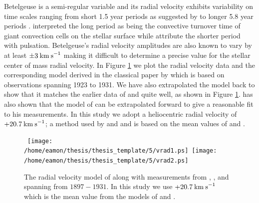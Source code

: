 Betelgeuse is a  semi-regular variable and its radial velocity exhibits variability on time scales ranging from short 1.5 year periods as suggested by \cite{stebbins_1931} to longer 5.8 year periods \citep{spencer_jones_1928,smith_1989}. 
\cite{stothers_1971} interpreted the long period as being the convective turnover time of giant convection cells on the stellar surface while \cite{dupree_1990} attribute the shorter period with pulsation. Betelgeuse's radial velocity amplitudes are also known to vary by at least $\pm 3\>{\rm km\>s}^{-1}$ \citep{smith_1989} making it difficult to determine a precise value for the stellar center of mass radial velocity. In Figure \ref{fig:5.3} we plot the radial velocity data and the corresponding model derived in the classical paper by \cite{sanford_1933} which is based on observations spanning 1923 to 1931. We have also extrapolated the model back to show that it matches the earlier data of \cite{bottlinger_1911} and \cite{spencer_jones_1928} quite well, as shown in Figure \ref{fig:5.3}. \cite{goldberg_1984} has also shown that the model of \cite{sanford_1933} can be extrapolated forward to give a reasonable fit to his measurements. In this study we adopt a heliocentric radial velocity of $+20.7\>{\rm km\>s}^{-1}$;  a method used by \cite{weymann_1962} and \citet{harper_2008} and is based on the mean values of \cite{spencer_jones_1928} and \cite{sanford_1933}. 

\begin{figure}[!ht]
\centering 
\mbox{
          \texttt{[image: /home/eamon/thesis/thesis\_template/5/vrad1.ps]}
          \texttt{[image: /home/eamon/thesis/thesis\_template/5/vrad2.ps]}
          }
\caption[Radial velocity data and model for $\alpha$ Ori.]{The radial velocity model of \cite{sanford_1933} along with measurements from \cite{bottlinger_1911}, \cite{spencer_jones_1928}, and \cite{sanford_1933} spanning from $1897 - 1931$. In this study we use $+20.7\>{\rm km\>s}^{-1}$ which is the mean value from the models of \cite{spencer_jones_1928} and \cite{sanford_1933}.}
\label{fig:5.3}
\end{figure}

